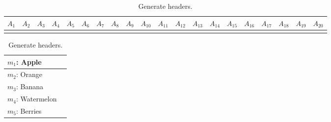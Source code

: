 \documentclass[12pt]{article}
\begin{document}
\begin{table}[t]
\scriptsize
\begin{center}
\begin{tabular}{ l|l|l|l|l|l|l|l|l|l|l|l|l|l|l|l|l|l|l|l| }
$A_{1}$ & $A_{2}$ & $A_{3}$ & $A_{4}$ & $A_{5}$ & $A_{6}$ & $A_{7}$ & $A_{8}$ & $A_{9}$ & $A_{10}$ & $A_{11}$ & $A_{12}$ & $A_{13}$ & $A_{14}$ & $A_{15}$ & $A_{16}$ & $A_{17}$ & $A_{18}$ & $A_{19}$ & $A_{20}$ \\ \toprule
 & & & & & & & & & & & & & & & & & & & \\ \midrule
\end{tabular}
\caption{Generate headers.}\label{tab:generate-headers-ex-1}
\end{center}
\end{table}

\newpage

\begin{table}[t]
\scriptsize
\begin{center}
\begin{tabular}{ ll }
$m_1$: Apple & \\ \midrule 
$m_2$: Orange & \\ \midrule 
$m_3$: Banana & \\ \midrule 
$m_4$: Watermelon & \\ \midrule 
$m_5$: Berries & \\ \bottomrule
\end{tabular}
\caption{Generate headers.}\label{tab:generate-headers-ex-2}
\end{center}
\end{table}
\end{document}
